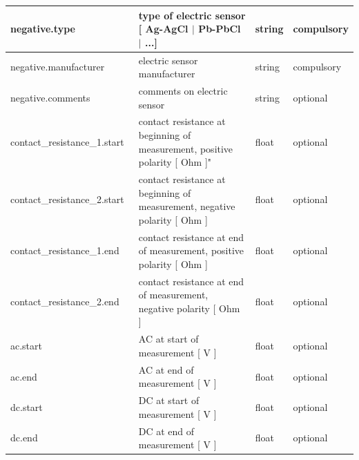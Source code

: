 \documentclass{article}
\begin{document}
\begin{table}[htb!]
\begin{tabular}{|l|p{3in}|l|l|}
        negative.type\ & type of electric sensor [ Ag-AgCl $|$ Pb-PbCl $|$ ...] & string & compulsory \\ \hline
        negative.manufacturer\ & electric sensor manufacturer & string & compulsory \\ \hline
        negative.comments\ & comments on electric sensor & string & optional \\ \hline
        contact\_resistance\_1.start\ & contact resistance at beginning of measurement, positive polarity [ Ohm ]" & float & optional \\ \hline
        contact\_resistance\_2.start\ & contact resistance at beginning of measurement, negative polarity [ Ohm ] & float & optional \\ \hline
        contact\_resistance\_1.end\ & contact resistance at end of measurement, positive polarity [ Ohm ] & float & optional \\ \hline
        contact\_resistance\_2.end\ & contact resistance at end of measurement, negative polarity [ Ohm ] & float & optional \\ \hline
        ac.start\ & AC at start of measurement [ V ] & float & optional \\ \hline
        ac.end\ & AC at end of measurement [ V ] & float & optional \\ \hline
        dc.start\ & DC at start of measurement [ V ] & float & optional \\ \hline
        dc.end\ & DC at end of measurement [ V ] & float & optional \\ \hline
        
    \end{tabular}
    \label{tab:electric01}
\end{table}    
\end{document}
